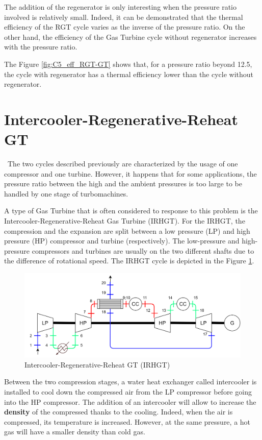 The addition of the regenerator is only interesting when the pressure ratio involved is relatively small. Indeed, it can be demonstrated that the thermal efficiency of the RGT cycle varies as the inverse of the pressure ratio. On the other hand, the efficiency of the Gas Turbine cycle without regenerator increases with the pressure ratio. 

The Figure \ref{fig:C5_eff_RGT-GT} shows that, for a pressure ratio beyond 12.5, the cycle with regenerator has a thermal efficiency lower than the cycle without regenerator. 

\section{Intercooler-Regenerative-Reheat GT}
\quad\ The two cycles described previously are characterized by the usage of one compressor and one turbine. However, it happens that for some applications, the pressure ratio between the high and the ambient pressures is too large to be handled by one stage of turbomachines.

A type of Gas Turbine that is often considered to response to this problem is the Intercooler-Regenerative-Reheat Gas Turbine (IRHGT). For the IRHGT, the compression and the expansion are split between a low pressure (LP) and high pressure (HP) compressor and turbine (respectively). The low-pressure and high-pressure compressors and turbines are usually on the two different shafts due to the difference of rotational speed. The IRHGT cycle is depicted in the Figure \ref{fig:C5_IRHGT}.


\begin{figure}[h]
\centering
\includegraphics[scale=0.15]{IRHGT}
\caption{Intercooler-Regenerative-Reheat GT (IRHGT)}
\label{fig:C5_IRHGT}
\end{figure}

Between the two compression stages, a water heat exchanger called intercooler is installed to cool down the compressed air from the LP compressor before going into the HP compressor. The addition of an intercooler will allow to increase the \textbf{density} of the compressed thanks to the cooling. Indeed, when the air is compressed, its temperature is increased. However, at the same pressure, a hot gas will have a smaller density than cold gas. 

